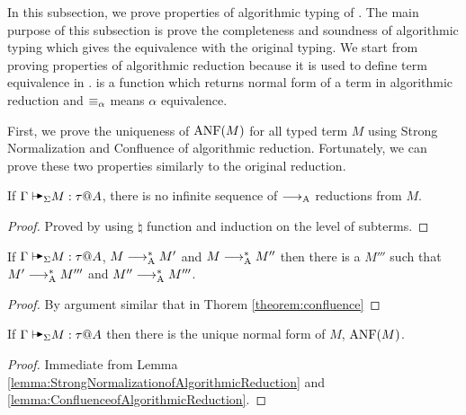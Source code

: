 In this subsection, we prove properties of algorithmic typing of \LMD. The main
purpose of this subsection is prove the completeness and soundness of
algorithmic typing which gives the equivalence with the original typing. We
start from proving properties of algorithmic reduction because it is used to
define term equivalence in \QAANF. \ANF is a function which returns normal form
of a term in algorithmic reduction and \( \equiv_\alpha \) means \( \alpha \)
equivalence.

\begin{center}
\end{center}

First, we prove the uniqueness of \( \text{ANF}(M) \) for all typed term \( M \)
using Strong Normalization and Confluence of algorithmic reduction.
Fortunately, we can prove these two properties similarly to the original
reduction.

\begin{lemma}
    \label{lemma:StrongNormalizationofAlgorithmicReduction}
    If \( \G \AVS M :\tau @ A\), there is no infinite sequence of \( \longrightarrow_{\text{A}} \) reductions from \( M \).
\end{lemma}

\begin{proof}
    Proved by using \( \natural \) function and induction on the level of subterms.
\end{proof}

\begin{lemma}
    \label{lemma:ConfluenceofAlgorithmicReduction}
    If \( \G \AVS M :\tau @ A\), \( M \longrightarrow_{\text{A}}^* M' \) and \(M \longrightarrow_{\text{A}}^* M''\)
    then there is a \( M''' \) such that \( M' \longrightarrow_{\text{A}}^* M''' \) and \( M'' \longrightarrow_{\text{A}}^* M''' \).
\end{lemma}

\begin{proof}
    By argument similar that in Thorem \ref{theorem:confluence} 
\end{proof}

\begin{lemma}
    \label{lemma:UniquenessOfANF}
    If \( \G \AVS M : \tau @ A \) then there is the unique normal form of \( M \), \( \text{ANF}(M) \).
\end{lemma}

\begin{proof}
    Immediate from Lemma \ref{lemma:StrongNormalizationofAlgorithmicReduction} and \ref{lemma:ConfluenceofAlgorithmicReduction}.
\end{proof}

